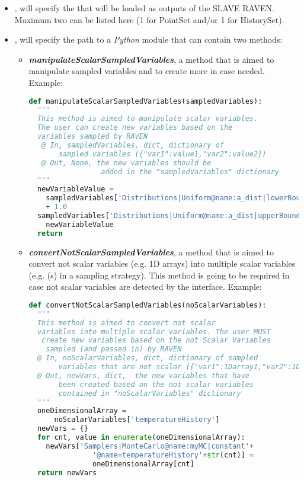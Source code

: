 \begin{itemize}
  \item  {},  will specify the   that will be loaded as outputs of the SLAVE RAVEN.
  Maximum two   can be listed here (1 for PointSet and/or 1 for HistorySet).
  \item  {},  will specify the path to a \textit{Python} module that can contain two methods:
      \begin{itemize}
         \item \textbf{\textit{manipulateScalarSampledVariables}}, a method that is aimed to manipulate sampled variables and to create more in case needed.
         Example:
          \begin{lstlisting}[language=python]
def manipulateScalarSampledVariables(sampledVariables):
  """
  This method is aimed to manipulate scalar variables.
  The user can create new variables based on the
  variables sampled by RAVEN
   @ In, sampledVariables, dict, dictionary of
       sampled variables ({"var1":value1,"var2":value2})
   @ Out, None, the new variables should be
                 added in the "sampledVariables" dictionary
  """
  newVariableValue =
    sampledVariables['Distributions|Uniform@name:a_dist|lowerBound']
    + 1.0
  sampledVariables['Distributions|Uniform@name:a_dist|upperBound'] =
    newVariableValue
  return
           \end{lstlisting}

         \item \textbf{\textit{convertNotScalarSampledVariables}}, a method that is aimed to convert not scalar variables (e.g. 1D arrays) into multiple scalar variables
         (e.g.  (s) in a sampling strategy).
          This method is going to be required in case not scalar variables are detected by the interface.
          Example:
          \begin{lstlisting}[language=python]
 def convertNotScalarSampledVariables(noScalarVariables):
  """
  This method is aimed to convert not scalar
  variables into multiple scalar variables. The user MUST
   create new variables based on the not Scalar Variables
    sampled (and passed in) by RAVEN
  @ In, noScalarVariables, dict, dictionary of sampled
       variables that are not scalar ({"var1":1Darray1,"var2":1Darray2})
  @ Out, newVars, dict,  the new variables that have
       been created based on the not scalar variables
       contained in "noScalarVariables" dictionary
  """
  oneDimensionalArray =
      noScalarVariables['temperatureHistory']
  newVars = {}
  for cnt, value in enumerate(oneDimensionalArray):
    newVars['Samplers|MonteCarlo@name:myMC|constant'+
               '@name=temperatureHistory'+str(cnt)] =
               oneDimensionalArray[cnt]
  return newVars
           \end{lstlisting}
      \end{itemize}
\end{itemize}

